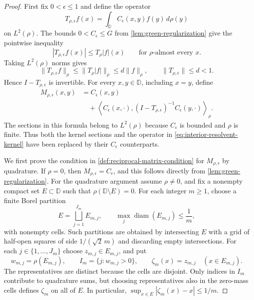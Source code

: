 \begin{proof}
First fix $0<\epsilon\le1$ and define the operator
\[
 T_{\rho,\epsilon}f(x)
 =\int_{\mathbb D}C_\epsilon(x,y)f(y)\,d\rho(y)
\]
on $L^2(\rho)$. The bounds $0<C_\epsilon\le G$ from
\cref{lem:green-regularization} give the pointwise inequality
\[
 |T_{\rho,\epsilon}f(x)|\le T_\rho|f|(x)
 \qquad\text{for $\rho$-almost every }x.
\]
Taking $L^2(\rho)$ norms gives
\[
 \|T_{\rho,\epsilon}f\|_\rho
 \le\|T_\rho|f|\|_\rho\le d\|f\|_\rho,
 \qquad \|T_{\rho,\epsilon}\|\le d<1.
\]
Hence $I-T_{\rho,\epsilon}$ is invertible. For every $x,y\in\mathbb D$,
including $x=y$, define
\begin{equation}\label{eq:regularized-interior-resolvent}
 \begin{aligned}
 M_{\rho,\epsilon}(x,y)&=C_\epsilon(x,y)\\
 &\quad+\left\langle C_\epsilon(x,\cdot),
 (I-T_{\rho,\epsilon})^{-1}C_\epsilon(y,\cdot)
 \right\rangle_\rho.
 \end{aligned}
\end{equation}
The sections in this formula belong to $L^2(\rho)$ because
$C_\epsilon$ is bounded and $\rho$ is finite. Thus both the kernel
sections and the operator in \cref{eq:interior-resolvent-kernel}
have been replaced by their $C_\epsilon$ counterparts.

We first prove the condition in \cref{def:reciprocal-matrix-condition} for
$M_{\rho,\epsilon}$ by quadrature. If $\rho=0$, then
$M_{\rho,\epsilon}=C_\epsilon$, and this follows directly from
\cref{lem:green-regularization}. For the quadrature argument assume
$\rho\ne0$, and fix a nonempty compact set $E\subset\mathbb D$
such that $\rho(\mathbb D\setminus E)=0$.
For each integer $m\ge1$, choose a finite Borel partition
\[
 E=\bigsqcup_{j=1}^{J_m}E_{m,j},
 \qquad \max_j\operatorname{diam}(E_{m,j})\le\frac1m,
\]
with nonempty cells. Such partitions are obtained by intersecting
$E$ with a grid of half-open squares of side $1/(\sqrt2\,m)$
and discarding empty intersections. For each
$j\in\{1,\ldots,J_m\}$ choose $z_{m,j}\in E_{m,j}$, and put
\[
 w_{m,j}=\rho(E_{m,j}),\qquad
 I_m=\{j:w_{m,j}>0\},\qquad
 \zeta_m(x)=z_{m,j}\quad(x\in E_{m,j}).
\]
The representatives are distinct because the cells are disjoint.
Only indices in $I_m$ contribute to quadrature sums, but choosing
representatives also in the zero-mass cells defines $\zeta_m$ on
all of $E$. In particular,
$\sup_{x\in E}|\zeta_m(x)-x|\le1/m$.


\end{proof}
